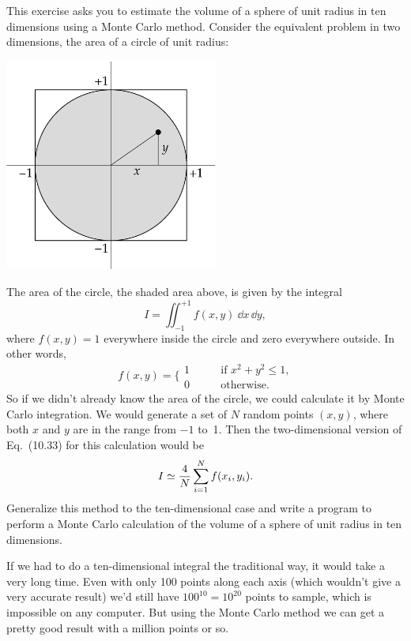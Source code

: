\documentclass[12pt]{article}
\begin{document}
\begin{exercises}
\exskip This exercise asks you to estimate
the volume of a sphere of unit radius in ten dimensions using a Monte Carlo
method.  Consider the equivalent problem in two dimensions, the area of a
circle of unit radius: \medskip
\begin{center}
\includegraphics[width=7cm]{circle.eps}
\end{center}
The area of the circle, the shaded area above, is given by the integral
\begin{displaymath}
I = \iint_{-1}^{+1} f(x,y) \>\dd x\,\dd y,
\end{displaymath}
where $f(x,y)=1$ everywhere inside the circle and zero everywhere outside.
In other words,
\begin{displaymath}
f(x,y) = \biggl\lbrace\begin{array}{ll}
           1 &\qquad\mbox{if $x^2+y^2\le1$,} \\
           0 &\qquad\mbox{otherwise.}
         \end{array}
\end{displaymath}
So if we didn't already know the area of the circle, we could calculate it
by Monte Carlo integration.  We would generate a set of $N$ random points
$(x,y)$, where both $x$ and $y$ are in the range from $-1$ to~1.  Then the
two-dimensional version of Eq.~(10.33) for this calculation would be
\begin{displaymath}
I \simeq {4\over N} \sum_{i=1}^N f(x_i,y_i).
\end{displaymath}
Generalize this method to the ten-dimensional case and write a program to
perform a Monte Carlo calculation of the volume of a sphere of unit radius
in ten dimensions.

If we had to do a ten-dimensional integral the traditional way, it would
take a very long time.  Even with only 100 points along each axis (which
wouldn't give a very accurate result) we'd still have $100^{10} = 10^{20}$
points to sample, which is impossible on any computer.  But using the Monte
Carlo method we can get a pretty good result with a million points or so.



\end{exercises}
\end{document}
